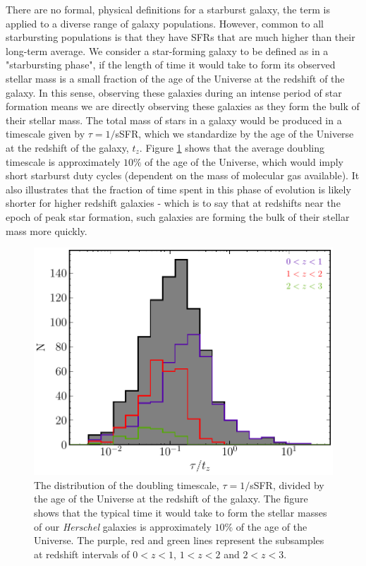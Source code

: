 There are no formal, physical definitions for a starburst galaxy, the term is applied to a diverse range of galaxy populations. However, common to all starbursting populations is that they have SFRs that are much higher than their long-term average. We consider a star-forming galaxy to be defined as in a "starbursting phase", if the length of time it would take to form its observed stellar mass is a small fraction of the age of the Universe at the redshift of the galaxy. In this sense, observing these galaxies during an intense period of star formation means we are directly observing these galaxies as they form the bulk of their stellar mass. The total mass of stars in a galaxy would be produced in a timescale given by $\tau = 1/$sSFR, which we standardize by the age of the Universe at the redshift of the galaxy, $t_z$. Figure \ref{fig:tau_against_age} shows that the average doubling timescale is approximately $10\%$ of the age of the Universe, which would imply short starburst duty cycles (dependent on the mass of molecular gas available). It also illustrates that the fraction of time spent in this phase of evolution is likely shorter for higher redshift galaxies - which is to say that at redshifts near the epoch of peak star formation, such galaxies are forming the bulk of their stellar mass more quickly.

\begin{figure}
	\centering
	\includegraphics[width=0.75\columnwidth]{Figures/tau_against_age.pdf}
	\caption[Doubling timescale of \textit{Herschel} galaxies]{The distribution of the doubling timescale, $\tau = 1/$sSFR, divided by the age of the Universe at the redshift of the galaxy. The figure shows that the typical time it would take to form the stellar masses of our \textit{Herschel} galaxies is approximately $10\%$ of the age of the Universe. The purple, red and green lines represent the subsamples at redshift intervals of $0 < z < 1$, $1 < z < 2$ and $2 < z < 3$.}
	\label{fig:tau_against_age}
\end{figure}

